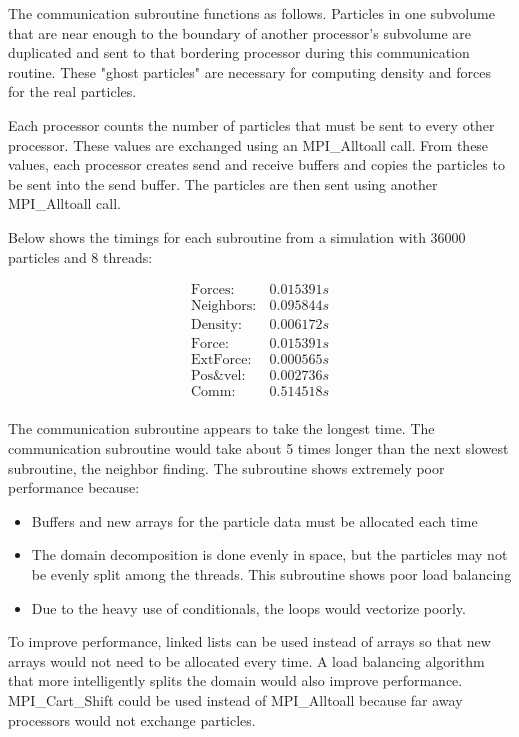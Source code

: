\documentclass{scrartcl}
\begin{document}
  The communication subroutine functions as follows. Particles in one subvolume that are near enough to the boundary of another processor's subvolume are duplicated and sent to that bordering processor during this communication routine. These "ghost particles" are necessary for computing density and forces for the real particles.
  
  Each processor counts the number of particles that must be sent to every other processor. These values are exchanged using an MPI\_Alltoall call. From these values, each processor creates send and receive buffers and copies the particles to be sent into the send buffer. The particles are then sent using another MPI\_Alltoall call.
  
  \newpage
  Below shows the timings for each subroutine from a simulation with 36000 particles and 8 threads:
  
  \[\begin{array}{lc}
  \mathrm{Forces:}     & 0.015391 s \\
  \mathrm{Neighbors:}  & 0.095844 s \\
  \mathrm{Density:}    & 0.006172 s \\
  \mathrm{Force:}      & 0.015391 s \\
  \mathrm{Ext Force:}  & 0.000565 s \\
  \mathrm{Pos \& vel:}  & 0.002736 s \\
  \mathrm{Comm:}       & 0.514518 s \\
  \end{array}\]
  
  
  The communication subroutine appears to take the longest time. The communication subroutine would take about 5 times longer than the next slowest subroutine, the neighbor finding. The subroutine shows extremely poor performance because:
  
  \begin{itemize}
  	\item Buffers and new arrays for the particle data must be allocated each time
  	\item The domain decomposition is done evenly in space, but the particles may not be evenly split among the threads. This subroutine shows poor load balancing
  	\item Due to the heavy use of conditionals, the loops would vectorize poorly.
  \end{itemize}
  
  To improve performance, linked lists can be used instead of arrays so that new arrays would not need to be allocated every time. A load balancing algorithm that more intelligently splits the domain would also improve performance. MPI\_Cart\_Shift could be used instead of MPI\_Alltoall because far away processors would not exchange particles.
  
\end{document}
